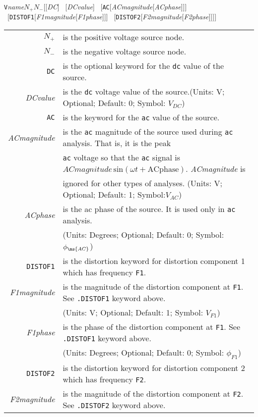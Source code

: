 \texttt{V}\textit{name}$N_{+}$$N_{-}$[[\textit{DC}] \
[\textit{DCvalue}] \
[\texttt{AC}[\textit{ACmagnitude}[\textit{ACphase}]]] \
[\texttt{DISTOF1}[\textit{F1magnitude}[\textit{F1phase}]]] \
[\texttt{DISTOF2}[\textit{F2magnitude}[\textit{F2phase}]]]]
\newline
\begin{tabular}{r l}
$N_{+}$ & is the positive voltage source node.\\
$N_{-}$ & is the negative voltage source node.\\
\texttt{DC} & is the optional keyword for the \texttt{dc} value of
the source.\\
\textit{DCvalue} & is the \texttt{dc} voltage value of the source.(Units: V; Optional; Default: 0; Symbol: $V_{DC}$)\\
\texttt{AC} & is the keyword for the \texttt{ac} value of the source.\\
\textit{ACmagnitude} & is the \texttt{ac} magnitude of the source
used during \texttt{ac} analysis. That is, it is the peak\\
& \texttt{ac} voltage so that the \texttt{ac} signal is $\textit{ACmagnitude}\,\mbox{sin}(\omega t + \mbox{ACphase})$. \textit{ACmagnitude} is\\
& ignored for other types of analyses. (Units: V; Optional; Default: 1; Symbol:$V_{AC}$)\\
\textit{ACphase} & is the ac phase of the source. It is used only in \texttt{ac} analysis.\\
& (Units: Degrees; Optional; Default: 0; Symbol:$\phi_{\ms{AC}}$)\\
\texttt{DISTOF1} & is the distortion keyword for distortion component 1 which has frequency \texttt{F1}.\\
\textit{F1magnitude} & is the magnitude of the distortion component at \texttt{F1}. See \texttt{.DISTOF1} keyword above.\\
& (Units: V; Optional; Default: 1; Symbol: $V_{F1}$)\\
\textit{F1phase} & is the phase of the distortion component at \texttt{F1}. See \texttt{.DISTOF1} keyword above.\\
& (Units: Degrees; Optional; Default: 0; Symbol: $\phi_{F1}$)\\
\texttt{DISTOF2} & is the distortion keyword for distortion component 2 which has frequency {\tt F2}.\\
\textit{F2magnitude} & is the magnitude of the distortion component at \texttt{F2}. See \texttt{.DISTOF2} keyword above.\\

\end{tabular}$$
